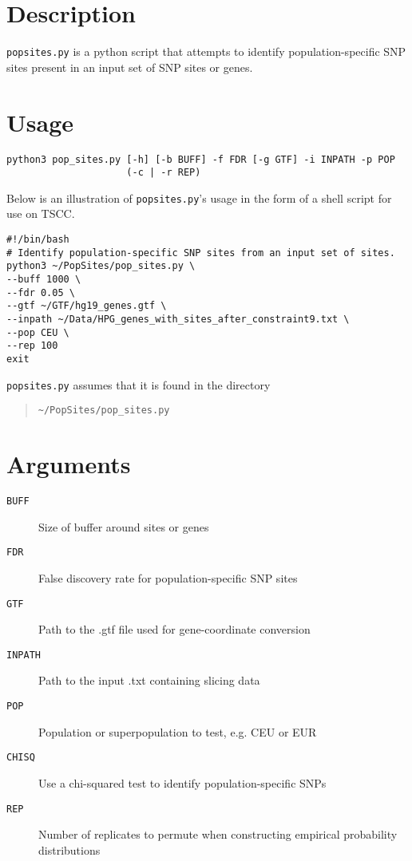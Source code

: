 \documentclass[12pt]{scrartcl}
\begin{document}
\maketitle
\section{Description}
\texttt{pop{\textunderscore}sites.py} is a python script that attempts to  identify population-specific SNP sites present in an input set of SNP sites or genes. 
\section{Usage}
\begin{verbatim}
python3 pop_sites.py [-h] [-b BUFF] -f FDR [-g GTF] -i INPATH -p POP
                     (-c | -r REP)
\end{verbatim}
Below is an illustration of \texttt{pop{\textunderscore}sites.py}'s usage in the form of a shell script for use on TSCC.
\begin{verbatim}
#!/bin/bash
# Identify population-specific SNP sites from an input set of sites.
python3 ~/PopSites/pop_sites.py \
--buff 1000 \
--fdr 0.05 \
--gtf ~/GTF/hg19_genes.gtf \
--inpath ~/Data/HPG_genes_with_sites_after_constraint9.txt \
--pop CEU \
--rep 100
exit
\end{verbatim}
\texttt{pop{\textunderscore}sites.py} assumes that it is found in the directory
\begin{quote}
\begin{verbatim}
~/PopSites/pop_sites.py
\end{verbatim}
\end{quote}

\section{Arguments}
\begin{description}
\item[\texttt{BUFF}] Size of buffer around sites or genes
\item[\texttt{FDR}] False discovery rate for population-specific SNP sites
\item[\texttt{GTF}] Path to the .gtf file used for gene-coordinate conversion
\item[\texttt{INPATH}] Path to the input .txt containing slicing data
\item[\texttt{POP}] Population or superpopulation to test, e.g. CEU or EUR
\item[\texttt{CHISQ}] Use a chi-squared test to identify population-specific SNPs
\item[\texttt{REP}] Number of replicates to permute when constructing empirical probability distributions
\end{description}
\end{document}
